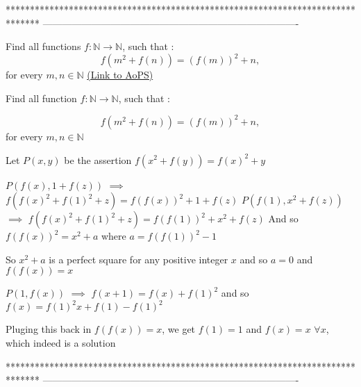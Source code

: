 *******************************************************************************
-------------------------------------------------------------------------------

\begin{problem}
	Find all functions $f : \mathbb{N} \rightarrow \mathbb{N}$, such that :
\[ f(m^2 + f(n)) = (f(m))^2 + n, \]
for every $m, n \in \mathbb{N}$
	\flushright \href{https://artofproblemsolving.com/community/c6h442803}{(Link to AoPS)}
\end{problem}



\begin{solution}
	\begin{tcolorbox}Find all function $f : \mathbb{N} \rightarrow \mathbb{N}$, such that :

\[ f(m^2 + f(n)) = (f(m))^2 + n, \] for every $m, n \in \mathbb{N}$\end{tcolorbox}
Let $P(x,y)$ be the assertion $f(x^2+f(y))=f(x)^2+y$

$P(f(x),1+f(z))$ $\implies$ $f(f(x)^2+f(1)^2+z)=f(f(x))^2+1+f(z)$
$P(f(1),x^2+f(z))$ $\implies$ $f(f(x)^2+f(1)^2+z)=f(f(1))^2+x^2+f(z)$
And so $f(f(x))^2=x^2+a$ where $a=f(f(1))^2-1$

So $x^2+a$ is a perfect square for any positive integer $x$ and so $a=0$ and $f(f(x))=x$

$P(1,f(x))$ $\implies$ $f(x+1)=f(x)+f(1)^2$ and so $f(x)=f(1)^2x+f(1)-f(1)^2$

Pluging this back in $f(f(x))=x$, we get $f(1)=1$ and $\boxed{f(x)=x}$ $\forall x$, which indeed is a solution
\end{solution}
*******************************************************************************
-------------------------------------------------------------------------------

